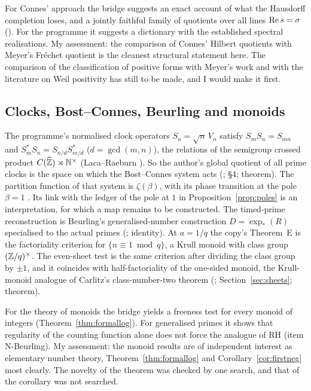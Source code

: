 For Connes' approach the bridge suggests an exact account of what the Hausdorff completion loses, and a jointly faithful family of quotients over all lines $\operatorname{Re} s=\sigma$ (). For the programme it suggests a dictionary with the established spectral realisations.
My assessment: the comparison of Connes' Hilbert quotients with Meyer's Fréchet quotient is the cleanest structural statement here. The comparison of the classification of positive forms with Meyer's work and with the literature on Weil positivity has still to be made, and I would make it first.

\subsection{Clocks, Bost--Connes, Beurling and monoids}

The programme's normalised clock operators $S_n=\sqrt n\,V_n$ satisfy $S_mS_n=S_{mn}$ and $S_m^*S_n=S_{n/d}S_{m/d}^*$ ($d=\gcd(m,n)$), the relations of the semigroup crossed product $C(\widehat{\mathbb{Z}})\rtimes\mathbb{N}^\times$ (Laca--Raeburn \cite{LacaRaeburn}). So the author's global quotient of all prime clocks is the space on which the Bost--Connes system acts (;  §4; theorem). The partition function of that system is $\zeta(\beta)$, with its phase transition at the pole $\beta=1$ \cite{BostConnes}. Its link with the ledger of the pole at $1$ in Proposition~\ref{prop:poles} is an interpretation, for which a map remains to be constructed.
The timed-prime reconstruction is Beurling's generalised-number construction $D=\exp_*(R)$ specialised to the actual primes (; identity).
At $a=1/q$ the copy's Theorem~E is the factoriality criterion for $\{n\equiv1\bmod q\}$, a Krull monoid with class group $(\mathbb{Z}/q)^\times$. The even-sheet test is the same criterion after dividing the class group by $\pm1$, and it coincides with half-factoriality of the one-sided monoid, the Krull-monoid analogue of Carlitz's class-number-two theorem (\cite{BaginskiChapman,Carlitz}; Section~\ref{sec:sheets}; theorem).

For the theory of monoids the bridge yields a freeness test for every monoid of integers (Theorem~\ref{thm:formallog}). For generalised primes it shows that regularity of the counting function alone does not force the analogue of RH (item N-Beurling).
My assessment: the monoid results are of independent interest as elementary number theory, Theorem~\ref{thm:formallog} and Corollary~\ref{cor:firstneg} most clearly. The novelty of the theorem was checked by one search, and that of the corollary was not searched.

